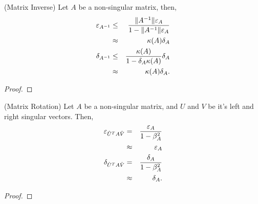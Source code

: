 \begin{proposition}(Matrix Inverse)
  \label{prop:inv}
  Let $A$ be a non-singular matrix, then, 
  \begin{eqnarray}
    \varepsilon_{A^{-1}} 
    &\le& \frac{\|A^{-1}\| \varepsilon_{A}}{1 - \|A^{-1}\|\varepsilon_{A}} \\
      &\approx& \kappa(A) \delta_{A} \\
   \delta_{A^{-1}} 
      &\le& \frac{\kappa(A)}{1 - \delta_{A}\kappa(A)} \delta_{A} \\
      &\approx& \kappa(A) \delta_{A}.
  \end{eqnarray}
\end{proposition}
\begin{proof}
\end{proof}

\begin{proposition}(Matrix Rotation)
  \label{prop:rot}
  Let $A$ be a non-singular matrix, and $U$ and $V$ be it's left and right singular vectors. Then, 
  \begin{eqnarray}
      \varepsilon_{\hat{U}^T A \hat{V}} &=& \frac{\varepsilon_{A}}{1 - \beta_A^2} \\
                         &\approx& \varepsilon_{A} \\
      \delta_{\hat{U}^T A \hat{V}} &=& \frac{\delta_{A}}{1 - \beta_A^2} \\
                         &\approx& \delta_{A}.
  \end{eqnarray}
\end{proposition}
\begin{proof}
\end{proof}

